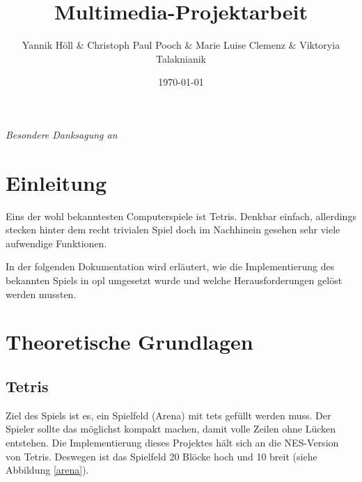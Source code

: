 \documentclass[11pt]{article}
\title{\textbf{Multimedia-Projektarbeit}}
\author{Yannik Höll \& Christoph Paul Pooch \& Marie Luise Clemenz \& Viktoryia Talaknianik}
\date{\today}
\newcommand{\refabb}[1]{Abbildung \ref{#1}}
\begin{document}
\begin{titlingpage}
    \maketitle
\end{titlingpage}
\pagebreak

\vspace*{\fill}
\begin{center}
\textit{
  Besondere Danksagung an 
}  
\end{center}
\vspace*{\fill}
\pagebreak

\tableofcontents
\pagebreak

\listoffigures
\pagebreak

\glsaddall
\printglossary 
\pagebreak

\section{Einleitung} 
Eins der wohl bekanntesten Computerspiele ist Tetris. Denkbar einfach, allerdings stecken hinter
dem recht trivialen Spiel doch im Nachhinein gesehen sehr viele aufwendige Funktionen.

In der folgenden Dokumentation wird erläutert, wie die Implementierung des bekannten Spiels in \gls{opl} 
umgesetzt wurde und welche Herausforderungen gelöst werden mussten.

\pagebreak

\section{Theoretische Grundlagen} \label{tgl}

\subsection{Tetris} \label{def-tet}
Ziel des Spiels ist es, ein Spielfeld (Arena) mit \glspl{tet} gefüllt werden muss. Der Spieler sollte das möglichst kompakt machen, 
damit volle Zeilen ohne Lücken entstehen. Die Implementierung dieses Projektes hält sich an die NES-Version von Tetris. 
Deswegen ist das Spielfeld 20 Blöcke hoch und 10 breit (siehe \refabb{arena}). 
\end{document}
